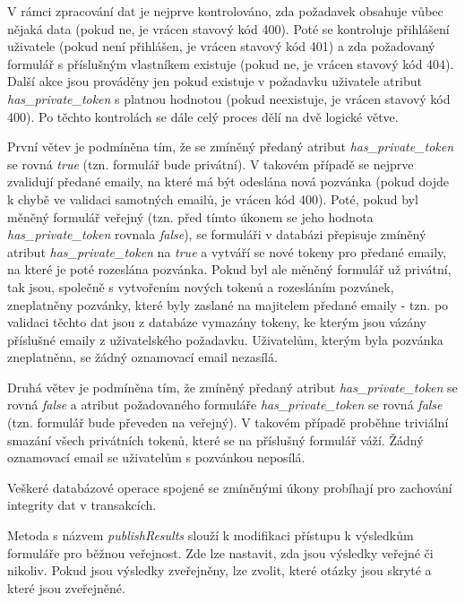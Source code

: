 			V rámci zpracování dat je nejprve kontrolováno, zda požadavek obsahuje vůbec nějaká data (pokud ne, je vrácen stavový kód 400). Poté se kontroluje přihlášení uživatele (pokud není přihlášen, je vrácen stavový kód 401) a zda požadovaný formulář s příslušným vlastníkem existuje (pokud ne, je vrácen stavový kód 404). Další akce jsou prováděny jen pokud existuje v požadavku uživatele atribut \textit{has\_private\_token} s platnou hodnotou (pokud neexistuje, je vrácen stavový kód 400). Po těchto kontrolách se dále celý proces dělí na dvě logické větve. 
			
			První větev je podmíněna tím, že se zmíněný předaný atribut \textit{has\_private\_token} se rovná \textit{true} (tzn. formulář bude privátní). V takovém případě se nejprve zvalidují předané emaily, na které má být odeslána nová pozvánka (pokud dojde k chybě ve validaci samotných emailů, je vrácen kód 400). Poté, pokud byl měněný formulář veřejný (tzn. před tímto úkonem se jeho hodnota \textit{has\_private\_token} rovnala \textit{false}), se formuláři v databázi přepisuje zmíněný atribut \textit{has\_private\_token} na \textit{true} a vytváří se nové tokeny pro předané emaily, na které je poté rozeslána pozvánka. Pokud byl ale měněný formulář už privátní, tak jsou, společně s vytvořením nových tokenů a rozesláním pozvánek, zneplatněny pozvánky, které byly zaslané na majitelem předané emaily - tzn. po validaci těchto dat jsou z databáze vymazány tokeny, ke kterým jsou vázány příslušné emaily z uživatelského požadavku. Uživatelům, kterým byla pozvánka zneplatněna, se žádný oznamovací email nezasílá.
			
			Druhá větev je podmíněna tím, že zmíněný předaný atribut \textit{has\_private\_token} se rovná \textit{false} a atribut požadovaného formuláře \textit{has\_private\_token} se rovná \textit{false} (tzn. formulář bude převeden na veřejný). V takovém případě proběhne triviální smazání všech privátních tokenů, které se na příslušný formulář váží. Žádný oznamovací email se uživatelům s pozvánkou neposílá.
			
			Veškeré databázové operace spojené se zmíněnými úkony probíhají pro zachování integrity dat v transakcích.
			
			\label{sec:form_publish_results}
			Metoda s názvem \textit{publishResults} slouží k modifikaci přístupu k výsledkům formuláře pro běžnou veřejnost. Zde lze nastavit, zda jsou výsledky veřejné či nikoliv. Pokud jsou výsledky zveřejněny, lze zvolit, které otázky jsou skryté a které jsou zveřejněné.
			
